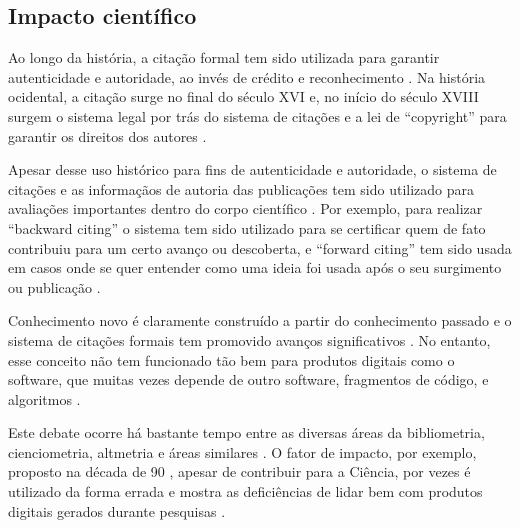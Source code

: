 \subsection{Impacto científico}

Ao longo da história, a citação formal tem sido utilizada para garantir
autenticidade e autoridade, ao invés de crédito e reconhecimento
\cite{katz2014transitive}.
Na história ocidental, a citação surge no final do século XVI e, no início do
século XVIII surgem o sistema legal por trás do sistema de citações e a lei de
``copyright'' para garantir os direitos dos autores \cite{katz2014transitive}.

Apesar desse uso histórico para fins de autenticidade e autoridade, o sistema de
citações e as informaçãos de autoria das publicações tem sido
utilizado para avaliações importantes dentro do corpo científico
\cite{katz2014transitive}.
Por exemplo, para realizar ``backward citing'' o sistema tem sido utilizado para se certificar quem de
fato contribuiu para um certo avanço ou descoberta, e ``forward citing'' tem
sido usada em casos onde se quer entender como uma ideia foi usada após o seu
surgimento ou publicação \cite{katz2014transitive}.

Conhecimento novo é claramente construído a partir do conhecimento passado e o
sistema de citações formais tem promovido avanços significativos
\cite{katz2014transitive}.
No entanto, esse conceito não tem funcionado tão bem para produtos digitais
como o software, que muitas vezes depende de outro software, fragmentos de
código, e algoritmos \cite{katz2014transitive}.

Este debate ocorre há bastante tempo entre as diversas áreas da bibliometria,
cienciometria, altmetria e áreas similares \cite{gouveia2013altmetria}.
O fator de impacto, por exemplo, proposto na década de 90
\cite{reuters2017history}, apesar de contribuir para a Ciência, por
vezes é utilizado da forma errada e mostra as deficiências de lidar bem com
produtos digitais gerados durante pesquisas \cite{katz2014transitive}.
